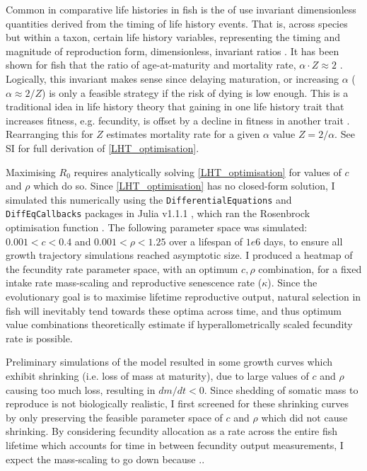 \documentclass[a4paper]{article} %
\begin{document}
Common in comparative life histories in fish is the of use invariant dimensionless quantities derived from the timing of life history events. That is, across species but within a taxon, certain life history variables, representing the timing and magnitude of reproduction form, dimensionless, invariant ratios \autocite{Charnov1990-invariant, Charnov1993}. It has been shown for fish that the ratio of age-at-maturity and mortality rate, $\alpha\cdot Z \approx 2$ \autocite{Charnov1993}. Logically, this invariant makes sense since delaying maturation, or increasing $\alpha$ ($\alpha \approx 2/Z$) is only a feasible strategy if the risk of dying is low enough. This is a traditional idea in life history theory that gaining in one life history trait that increases fitness, e.g. fecundity, is offset by a decline in fitness in another trait \autocite{Charlesworth1980, stearns1992evolution, Roff2006}. Rearranging this for $Z$ estimates mortality rate for a given $\alpha$ value $Z = 2/\alpha$.
See SI for full derivation of \cref{LHT_optimisation}.

Maximising $R_0$ requires analytically solving \cref{LHT_optimisation} for values of $c$ and $\rho$ which do so. Since \cref{LHT_optimisation} has no closed-form solution, I simulated this numerically using the \texttt{DifferentialEquations} and \texttt{DiffEqCallbacks} packages in Julia v1.1.1 \autocite{Bezanson2017}, which ran the Rosenbrock optimisation function \autocite{Rosenbrock1960}. The following parameter space was simulated: $0.001 < c < 0.4$ \autocite{Roff1983, Enberg2008, Atiqulla2013} and $0.001 < \rho < 1.25$ over a lifespan of $1e6$ days, to ensure all growth trajectory simulations reached asymptotic size. I produced a heatmap of the fecundity rate parameter space, with an optimum $c, \rho$ combination, for a fixed intake rate mass-scaling and reproductive senescence rate ($\kappa$). Since the evolutionary goal is to maximise lifetime reproductive output, natural selection in fish will inevitably tend towards these optima across time, and thus optimum value combinations theoretically estimate if hyperallometrically scaled fecundity rate is possible.

Preliminary simulations of the model resulted in some growth curves which exhibit shrinking (i.e. loss of mass at maturity), due to large values of $c$ and $\rho$ causing too much loss, resulting in $dm/dt < 0$. Since shedding of somatic mass to reproduce is not biologically realistic, I first screened for these shrinking curves by only preserving the feasible parameter space of $c$ and $\rho$ which did not cause shrinking.
By considering fecundity allocation as a rate across the entire fish lifetime which accounts for time in between fecundity output measurements, I expect the mass-scaling to go down because ..
\end{document}
